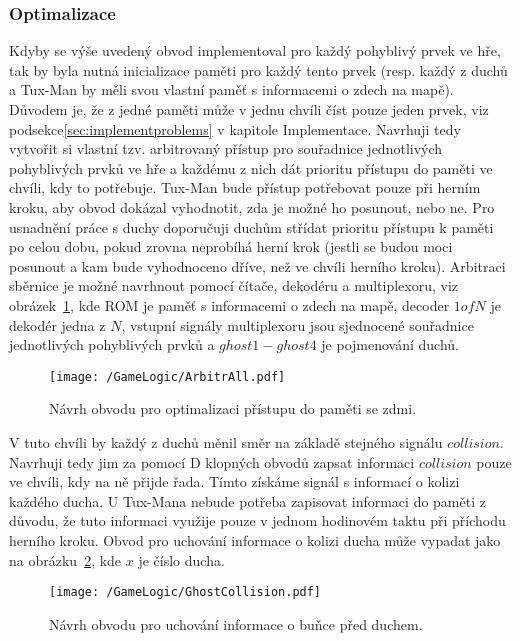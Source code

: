 \documentclass{report}
\begin{document}
\subsubsection{Optimalizace}
Kdyby se výše uvedený obvod implementoval pro každý pohyblivý prvek ve hře, tak by byla nutná inicializace paměti pro každý tento prvek (resp. každý z duchů a Tux-Man by měli svou vlastní paměť s informacemi o zdech na mapě). Důvodem je, že z jedné paměti může v jednu chvíli číst pouze jeden prvek, viz podsekce\ref{sec:implementproblems} v kapitole Implementace. Navrhuji tedy vytvořit si vlastní tzv. arbitrovaný přístup pro souřadnice jednotlivých pohyblivých prvků ve hře a každému z nich dát prioritu přístupu do paměti ve chvíli, kdy to potřebuje. Tux-Man bude přístup potřebovat pouze při herním kroku, aby obvod dokázal vyhodnotit, zda je možné ho posunout, nebo ne. Pro usnadnění práce s duchy doporučuji duchům střídat prioritu přístupu k paměti po celou dobu, pokud zrovna neprobíhá herní krok (jestli se budou moci posunout a kam bude vyhodnoceno dříve, než ve chvíli herního kroku). Arbitraci sběrnice je možné navrhnout pomocí čítače, dekodéru a multiplexoru, viz obrázek~\ref{fig:arbitrall}, kde ROM je paměť s informacemi o zdech na mapě, decoder $1 of N$ je dekodér jedna z $N$, vstupní signály multiplexoru jsou sjednocené souřadnice jednotlivých pohyblivých prvků a $ghost1 - ghost4$ je pojmenování duchů.
\begin{figure}
\centering
\texttt{[image: /GameLogic/ArbitrAll.pdf]}
\caption{Návrh obvodu pro optimalizaci přístupu do paměti se zdmi.}
\label{fig:arbitrall}
\end{figure}
V tuto chvíli by každý z duchů měnil směr na základě stejného signálu $collision$. Navrhuji tedy jim za pomocí D klopných obvodů zapsat informaci $collision$ pouze ve chvíli, kdy na ně přijde řada. Tímto získáme signál s informací o kolizi každého ducha. U Tux-Mana nebude potřeba zapisovat informaci do paměti z důvodu, že tuto informaci využije pouze v jednom hodinovém taktu při příchodu herního kroku. Obvod pro uchování informace o kolizi ducha může vypadat jako na obrázku~\ref{fig:ghostinfo}, kde $x$ je číslo ducha.
\begin{figure}
\centering
\texttt{[image: /GameLogic/GhostCollision.pdf]}
\caption{Návrh obvodu pro uchování informace o buňce před duchem.}
\label{fig:ghostinfo}
\end{figure}
\end{document}
